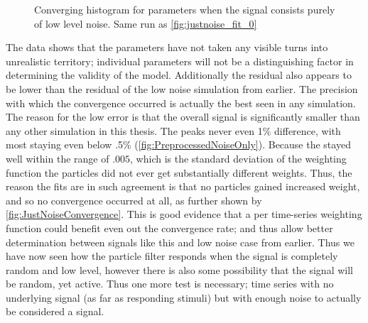 \begin{figure}[H]
\centering
{}
\caption{Converging histogram for parameters when the signal consists purely of low level noise. 
Same run as \autoref{fig:justnoise_fit_0}}
\label{fig:JustNoiseConvergence}
\end{figure}

The data shows that the parameters have not taken any visible turns into
unrealistic territory; individual parameters will not be a distinguishing factor
in determining the validity of the model. Additionally the residual 
also appears to be lower than the residual of the low noise simulation from earlier. 
The precision with which the convergence occurred is actually the best seen in any
simulation.  The reason for the low error is that the overall
signal is significantly smaller than any other simulation in this thesis.
The peaks never even 1\% difference, with most staying even below .5\% 
(\autoref{fig:PreprocessedNoiseOnly}). Because the stayed 
well within the range of $.005$, which is the standard deviation of the weighting function
the particles did not ever get substantially different weights. Thus, the reason
the fits are in such agreement is that no particles gained increased weight, and so
no convergence occurred at all, as further shown by \autoref{fig:JustNoiseConvergence}. 
This is good evidence that a per time-series weighting function could benefit
even out the convergence rate; and thus allow better determination between signals
like this and low noise case from earlier.
Thus we have now seen how the particle filter responds when the signal is completely
random and low level, however there is also some possibility that the signal will
be random, yet active. Thus one more test is necessary; time series with no 
underlying signal (as far as responding stimuli) but with enough noise to 
actually be considered a signal. 

